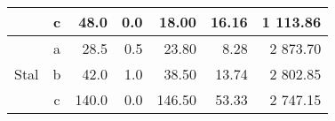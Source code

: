 \begin{table}[H]
{\begin{tabular}{|c|c|r|r|r|r|r|}
                                                                                                     & c        & 48.0                                                                               & 0.0                                                                                   & 18.00                                                                             & 16.16                                                                                       & 1 113.86                                                                      \\ \hline
    \multirow{3}{*}{Stal}                                                                            & a        & 28.5                                                                               & 0.5                                                                                   & 23.80                                                                             & 8.28                                                                                        & 2 873.70                                                                      \\ \cline{2-7} 
                                                                                                     & b        & 42.0                                                                               & 1.0                                                                                   & 38.50                                                                             & 13.74                                                                                       & 2 802.85                                                                      \\ \cline{2-7} 
                                                                                                     & c        & 140.0                                                                              & 0.0                                                                                   & 146.50                                                                            & 53.33                                                                                       & 2 747.15                                                                      \\ \hline
    \end{tabular}%
    }
    \end{table}